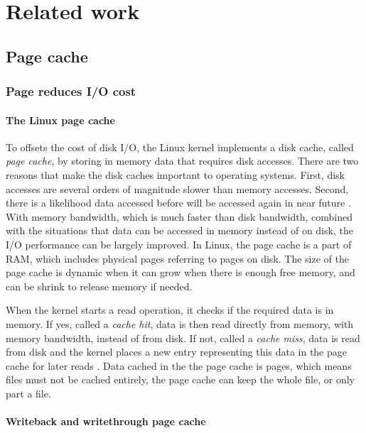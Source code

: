 \chapter{Related work}
\label{relatedwork}

\section{Page cache}

\subsection{Page reduces I/O cost}

\subsubsection{The Linux page cache}

To offsets the cost of disk I/O, the Linux kernel implements a disk cache, 
called \textit{page cache}, by storing in memory data that requires disk accesses. 
There are two reasons that make the disk caches important to operating systems. 
First, disk accesses are several orders of magnitude slower than memory accesses. 
Second, there is a likelihood data accessed before will be accessed again 
in near future \cite{linuxdev3rd2010}. 
With memory bandwidth, which is much faster than disk bandwidth, combined with 
the situations that data can be accessed in memory instead of on disk, the I/O 
performance can be largely improved. 
In Linux, the page cache is a part of RAM, which includes physical pages referring 
to pages on disk. 
The size of the page cache is dynamic when it can grow when there is enough 
free memory, and can be shrink to release memory if needed. 

When the kernel starts a read operation, it checks if the required data is in memory. 
If yes, called a \textit{cache hit}, data is then read directly from memory, 
with memory bandwidth, instead of from disk. 
If not, called a \textit{cache miss}, data is read from disk and the kernel 
places a new entry representing this data in the page cache for later reads 
\cite{linuxdev3rd2010}. 
Data cached in the the page cache is pages, which means files must not be 
cached entirely, the page cache can keep the whole file, or only part a file. 

\subsubsection{Writeback and writethrough page cache}

